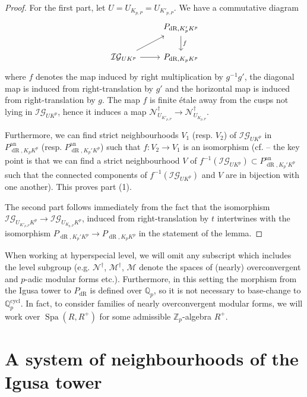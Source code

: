 \documentclass[10pt, oneside]{amsart}
\numberwithin{equation}{subsection}
\theoremstyle{definition}
\theoremstyle{remark}
\newcommand{\mbb}[1]{\mathbb{#1}}
\newcommand{\opn}[1]{\operatorname{#1}}
\begin{document}
\begin{proof}
For the first part, let $U = U_{K_{p, P}} = U_{K'_{p, P}}$. We have a commutative diagram 
\[
\begin{tikzcd}
                              & {P_{\opn{dR}, K_p'K^p}} \arrow[d, "f"] \\
\mathcal{IG}_{U K^p} \arrow[ru] \arrow[r] & {P_{\opn{dR}, K_p K^p}}               
\end{tikzcd}
\]
where $f$ denotes the map induced by right multiplication by $g^{-1}g'$, the diagonal map is induced from right-translation by $g'$ and the horizontal map is induced from right-translation by $g$. The map $f$ is finite \'{e}tale away from the cusps not lying in $\mathcal{IG}_{UK^p}$, hence it induces a map $\mathscr{N}^{\dagger}_{U_{K'_{p, P}}} \to \mathscr{N}^{\dagger}_{U_{K_{p, P}}}$. 

Furthermore, we can find strict neighbourhoods $V_1$ (resp. $V_2$) of $\mathcal{IG}_{U K^p}$ in $P^{\opn{an}}_{\opn{dR}, K_p K^p}$ (resp. $P^{\opn{an}}_{\opn{dR}, K_p'K^p}$) such that $f \colon V_2 \to V_1$ is an isomorphism (cf. \cite[Proposition 2.2.1]{KisinLai} -- the key point is that we can find a strict neighbourhood $V$ of $f^{-1}(\mathcal{IG}_{UK^p}) \subset P^{\opn{an}}_{\opn{dR}, K_p'K^p}$ such that the connected components of $f^{-1}(\mathcal{IG}_{UK^p})$ and $V$ are in bijection with one another). This proves part (1). 

The second part follows immediately from the fact that the isomorphism $\mathcal{IG}_{U_{K'_{p, P}} K^p} \to \mathcal{IG}_{U_{K_{p, P}} K^p}$, induced from right-translation by $t$ intertwines with the isomorphism $P_{\opn{dR}, K_p'K^p} \to P_{\opn{dR}, K_p K^p}$ in the statement of the lemma.
\end{proof}

When working at hyperspecial level, we will omit any subscript which includes the level subgroup (e.g. $\mathscr{N}^{\dagger}$, $\mathscr{M}^{\dagger}$, $\mathscr{M}$ denote the spaces of (nearly) overconvergent and $p$-adic modular forms etc.). Furthermore, in this setting the morphism from the Igusa tower to $P_{\opn{dR}}$ is defined over $\mbb{Q}_p$, so it is not necessary to base-change to $\mbb{Q}_p^{\opn{cycl}}$. In fact, to consider families of nearly overconvergent modular forms, we will work over $\opn{Spa}(R, R^+)$ for some admissible $\mbb{Z}_p$-algebra $R^+$.

\section{A system of neighbourhoods of the Igusa tower} \label{SectionNOCMFs}
\end{document}
